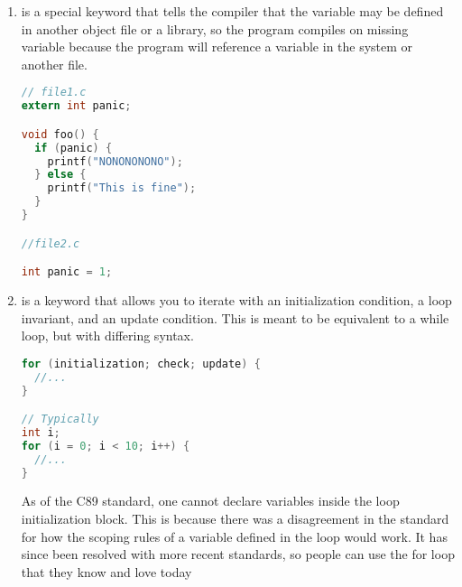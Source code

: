 \begin{enumerate}
\begin{lstlisting}[language=C]
void process_day(enum day foo) {
  switch(foo) {
    case monday:
      printf("Go home!\n"); break;
    // ...
  }
}
\end{lstlisting}

	      It is completely possible to assign enum values to either be different or the same. It is not advisable to rely on the compiler for consistent numbering, if you assign numbers. If you are going to use this abstraction, try not to break it.

\begin{lstlisting}[language=C]
enum day{
  monday = 0,
  tuesday = 0,
  wednesday = 0,
  thursday = 1,
  friday = 10,
  saturday = 10,
  sunday = 0};

void process_day(enum day foo) {
  switch(foo) {
    case monday:
      printf("Go home!\n"); break;
    // ...
  }
}
\end{lstlisting}

	    \item {} is a special keyword that tells the compiler that the variable may be defined in another object file or a library, so the program compiles on missing variable because the program will reference a variable in the system or another file.

\begin{lstlisting}[language=C]
// file1.c
extern int panic;

void foo() {
  if (panic) {
    printf("NONONONONO");
  } else {
    printf("This is fine");
  }
}

//file2.c

int panic = 1;
\end{lstlisting}

	    \item {} is a keyword that allows you to iterate with an initialization condition, a loop invariant, and an update condition.
        This is meant to be equivalent to a while loop, but with differing syntax.

\begin{lstlisting}[language=C]
for (initialization; check; update) {
  //...
}

// Typically
int i;
for (i = 0; i < 10; i++) {
  //...
}
\end{lstlisting}

	      As of the C89 standard, one cannot declare variables inside the  loop initialization block.
        This is because there was a disagreement in the standard for how the scoping rules of a variable defined in the loop would work.
        It has since been resolved with more recent standards, so people can use the for loop that they know and love today


\end{enumerate}
